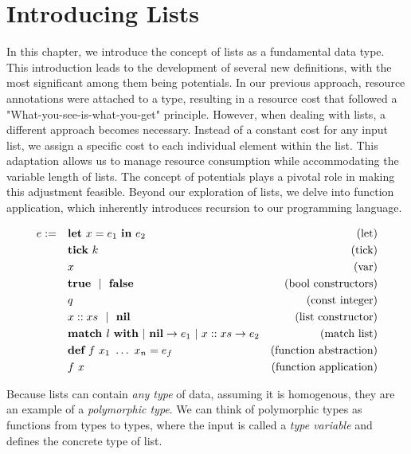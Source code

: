 \chapter{Introducing Lists}\label{chap:list-tick}

In this chapter, we introduce the concept of lists as a fundamental data type. This introduction leads to the development of several new definitions, with the most significant among them being potentials. In our previous approach, resource annotations were attached to a type, resulting in a resource cost that followed a "What-you-see-is-what-you-get" principle. However, when dealing with lists, a different approach becomes necessary. Instead of a constant cost for any input list, we assign a specific cost to each individual element within the list. This adaptation allows us to manage resource consumption while accommodating the variable length of lists. The concept of potentials plays a pivotal role in making this adjustment feasible. Beyond our exploration of lists, we delve into function application, which inherently introduces recursion to our programming language. 

\begin{definition}
   \label{def:prog-lang-6}

\begin{align*}
   e := ~~~ & \mathbf{let}~x = e_1~\mathbf{in}~e_2		& \text{(let)}\\
            & \mathbf{tick}~k				& \text{(tick)}\\
	    & x					& \text{(var)}\\
	    & \mathbf{true} ~~| ~~\mathbf{false}		& \text{(bool constructors)}\\
	    & q					& \text{(const integer)}\\
            & x :: xs ~~| ~~ \textbf{nil}      & \text{(list constructor)}\\
            & \textbf{match } l~\textbf{with}~|~\textbf{nil} \to e_1~|~x :: xs \to e_2           & \text{(match list)}\\
            & \textbf{def}~f~x_1~\dots~x_n = e_f       & \text{(function abstraction)}\\
            & f~x                               & \text{(function application)}\\
\end{align*}
\end{definition}

Because lists can contain \emph{any type} of data, assuming it is homogenous, they are an example of a \emph{polymorphic type}. We can think of polymorphic types as functions from types to types, where the input is called a \emph{type variable} and defines the concrete type of list. 

